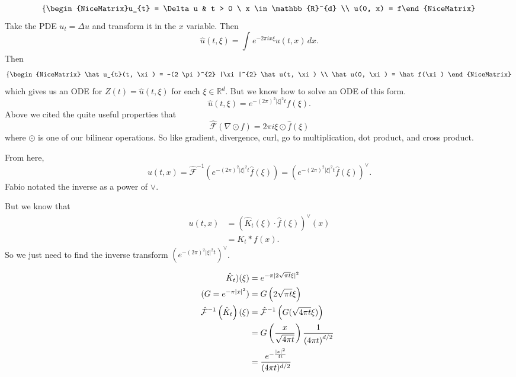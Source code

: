 \begin{example}
	\[ \left\{\begin{NiceMatrix}u_{t} = \Delta u & t > 0 \ x \in \mathbb{R}^{d} \\ u(0, x) = f\end{NiceMatrix}\right.  \]
	Take the PDE \( u_{t} = \Delta u \) and transform it in the \( x \) variable. Then
	\[ \hat u(t, \xi) = \int_{} e^{-2 \pi i x \xi} u(t, x) \, dx. \]
	Then
	\[
		\left\{\begin{NiceMatrix}
				\hat u_{t}(t, \xi) = -(2 \pi)^{2} |\xi|^{2} \hat u(t, \xi) \\
				\hat u(0, \xi) = \hat f(\xi)
		\end{NiceMatrix}\right. 
	\]
	which gives us an ODE for \( Z(t) = \hat u(t, \xi) \) for each \( \xi \in \mathbb{R}^{d} \). But we know how to solve an ODE of this form.
	\[ \hat u(t, \xi) = e^{-(2 \pi)^{2} |\xi|^{2} t} \hat f(\xi). \]
	Above we cited the quite useful properties that
	\[ \hat {\mathcal{F}}(\nabla \odot f) = 2 \pi i \xi \odot \hat f(\xi) \]
	where \( \odot \) is one of our bilinear operations. So like gradient, divergence, curl, go to multiplication, dot product, and cross product.

	From here, 
	\[ u(t, x) = \hat {\mathcal{F}}^{-1}\left( e^{-(2 \pi)^{2} |\xi|^{2} t}\hat f(\xi) \right) = \left( e^{-\left( 2 \pi \right)^{2} |\xi|^{2} t} \hat f(\xi) \right)^{\vee}. \]
	Fabio notated the inverse as a power of \( \vee \).

	But we know that
	\begin{align*}
		u(t, x) &= \left( \hat K_{t}(\xi) \cdot \hat f(\xi) \right)^{\vee}(x) \\
						&= K_{t} * f(x).
	\end{align*}
	So we just need to find the inverse transform \( \left( e^{-(2 \pi)^{2}|\xi|^{2} t} \right)^{\vee} \).

	\begin{align*}
		\hat K_{t})(\xi) &= e^{- \pi |2 \sqrt{\pi t} \xi|^{2}} \\
		\tag{\( G = e^{- \pi |x|^{2}} \)}&= G \left( 2 \sqrt{\pi t} \xi \right) \\
		\hat {\mathcal{F}}^{-1} \left( \hat K_{t} \right)(\xi)  &= \hat {\mathcal{F}}^{-1} \left( G(\sqrt{4 \pi t} \xi) \right) \\
																				&= G\left(\frac{x}{\sqrt{4 \pi t}}\right) \frac{1}{\left(4 \pi t\right)^{d/2}} \\
																				&= \frac{e^{- \frac{|x|^{2}}{4 t}}}{(4 \pi t)^{d/2}}
	\end{align*}
\end{example}



